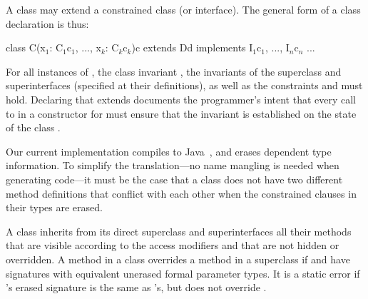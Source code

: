 A class may extend a constrained class (or interface).
The general form of a class declaration is thus:
\begin{xten}
class C(x$_1$: C$_1${c$_1$}, ..., x$_k$: C$_k${c$_k$}){c}
  extends D{d}
  implements I$_1${c$_1$}, ..., I$_n${c$_n$} {...}
\end{xten}
\noindent
For all instances of , the class invariant ,
the invariants of the superclass and superinterfaces (specified at
their definitions),
as well as the constraints  and  must hold.
Declaring that  extends 
documents the programmer's intent that
every call to  in a constructor for  must ensure
that the invariant  is established on the state of the class
.



Our current implementation compiles \Xten{} to Java~\cite{Java3}, and erases
dependent type information.  To simplify the translation---no
name mangling is needed when generating code---it
must be the case that a class does not have two different method
definitions that conflict with each other when the constrained
clauses in their types are erased.

A class inherits from its direct superclass and
superinterfaces all their methods that are visible according to the access
modifiers and that are not hidden or overridden.  A method
 in a class  overrides a method  in a
superclass  if  and  have signatures
with equivalent unerased formal parameter types.
It is a static error if 's erased signature is the same
as 's, but  does not override .

